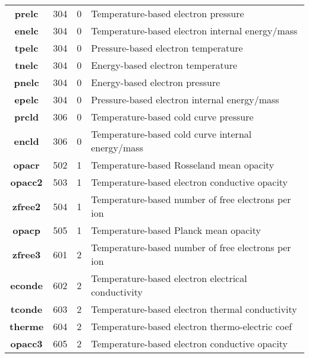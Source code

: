 \documentclass[11pt]{nmemo}
\begin{document}
\begin{table}[!ht]
\begin{center}
\begin{tabularx}{0.9\linewidth}{CDDL}

        \textbf{prelc} & 304 & 0 & Temperature-based electron pressure\\
        \textbf{enelc} & 304 & 0 & Temperature-based electron internal energy/mass\\
        \textbf{tpelc} & 304 & 0 & Pressure-based electron temperature\\
        \textbf{tnelc} & 304 & 0 & Energy-based electron temperature\\
        \textbf{pnelc} & 304 & 0 & Energy-based electron pressure\\
        \textbf{epelc} & 304 & 0 & Pressure-based electron internal energy/mass\\


        \textbf{prcld} & 306 & 0 & Temperature-based cold curve pressure\\
        \textbf{encld} & 306 & 0 & Temperature-based cold curve internal energy/mass\\


            \textbf{opacr}  & 502 & 1 & Temperature-based Rosseland mean opacity\\
            \textbf{opacc2} & 503 & 1 & Temperature-based electron conductive opacity\\
            \textbf{zfree2} & 504 & 1 & Temperature-based number of free electrons per ion\\
            \textbf{opacp}  & 505 & 1 & Temperature-based Planck mean opacity\\


            \textbf{zfree3} & 601 & 2 & Temperature-based number of free electrons per ion\\
            \textbf{econde} & 602 & 2 & Temperature-based electron electrical conductivity\\
            \textbf{tconde} & 603 & 2 & Temperature-based electron thermal conductivity\\
            \textbf{therme} & 604 & 2 & Temperature-based electron thermo-electric coef\\
            \textbf{opacc3} & 605 & 2 & Temperature-based electron conductive opacity\\



\end{tabularx}
\end{center}
\end{table}
\end{document}
